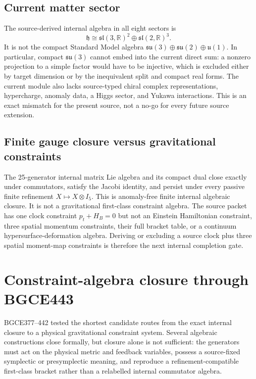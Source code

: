 \documentclass[11pt]{article}
\theoremstyle{definition}
\theoremstyle{remark}
\begin{document}
\subsection{Current matter sector}

The source-derived internal algebra in all eight sectors is
\begin{equation}
 \mathfrak h\cong
 \mathfrak{sl}(3,\mathbb R)^2\oplus
 \mathfrak{sl}(2,\mathbb R)^3.
\end{equation}
It is not the compact Standard Model algebra
$\mathfrak{su}(3)\oplus\mathfrak{su}(2)\oplus\mathfrak u(1)$. In particular, compact $\mathfrak{su}(3)$ cannot embed into the current direct sum: a nonzero projection to a simple factor would have to be injective, which is excluded either by target dimension or by the inequivalent split and compact real forms. The current module also lacks source-typed chiral complex representations, hypercharge, anomaly data, a Higgs sector, and Yukawa interactions. This is an exact mismatch for the present source, not a no-go for every future source extension.

\subsection{Finite gauge closure versus gravitational constraints}

The 25-generator internal matrix Lie algebra and its compact dual close exactly under commutators, satisfy the Jacobi identity, and persist under every passive finite refinement $X\mapsto X\otimes I_5$. This is anomaly-free finite internal algebraic closure. It is not a gravitational first-class constraint algebra. The source packet has one clock constraint $p_t+H_B=0$ but not an Einstein Hamiltonian constraint, three spatial momentum constraints, their full bracket table, or a continuum hypersurface-deformation algebra. Deriving or excluding a source clock plus three spatial moment-map constraints is therefore the next internal completion gate.

\section{Constraint-algebra closure through BGCE443}\label{sec:constraints09}

BGCE377--442 tested the shortest candidate routes from the exact internal closure to a physical gravitational constraint system. Several algebraic constructions close formally, but closure alone is not sufficient: the generators must act on the physical metric and feedback variables, possess a source-fixed symplectic or presymplectic meaning, and reproduce a refinement-compatible first-class bracket rather than a relabelled internal commutator algebra.
\end{document}
